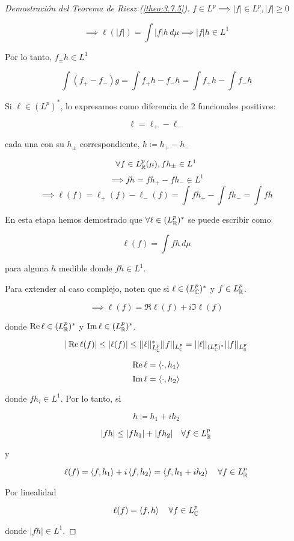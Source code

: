 \begin{proof}[Demostración del Teorema de Riesz (\ref{theo:3.7.5})]
        $f\in L^p\implies |f|\in L^p,|f|\geq 0$

        \[\implies \ell(|f|)=\int |f|h\,d\mu\implies |f|h\in L^1\]

        Por lo tanto, $f_{\pm}h\in L^1$

        \[\int (f_+-f_-)g=\int f_+h-f_-h=\int f_+h-\int f_-h\]

        Si $\ell\in (L^p)^*$, lo expresamos como diferencia de 2 funcionales positivos:

        \[\ell=\ell_+-\ell_-\]

        cada una con su $h_\pm$ correspondiente, $h\coloneqq h_+-h_-$

        \[\forall f\in L^p_{\mathbb{R}}(\mu), fh_\pm \in L^1\]
        \[\implies fh=fh_+-fh_-\in L^1\]
        \[\implies \ell(f)=\ell_+(f)-\ell_-(f)=\int fh_+-\int fh_-=\int fh\]

        En esta etapa hemos demostrado que $\forall \ell\in (L_{\mathbb{R}}^p)^*$ se puede escribir como 

        \[\ell(f)=\int fh\,d\mu\]

        para alguna $h$ medible donde $fh\in L^1$.

        Para extender al caso complejo, noten que si $\ell\in (L_{\mathbb{C}}^p)^*$ y $f\in L^p_{\mathbb{R}}$.

        \[\implies \ell(f)=\Re\ell(f)+i\Im\ell(f)\]

        donde $\operatorname{Re} \ell\in (L_{\mathbb{R}}^p)^*$ y $\operatorname{Im} \ell\in (L^p_{\mathbb{R}})^*$.

        \[|\operatorname{Re} \ell(f)|\leq |\ell(f)|\leq ||\ell||_{L_{\mathbb{C}}^p}^*||f||_{L_{\mathbb{C}}^p}=||\ell||_{(L_{\mathbb{C}}^p)^*}||f||_{L^p_{\mathbb{R}}}\]

        \[\operatorname{Re} \ell=\left\langle \cdot,h_1\right\rangle\]
        \[\operatorname{Im} \ell=\left\langle \cdot,h_2\right\rangle\]

        donde $fh_i\in L^1$. Por lo tanto, si 

        \[h\coloneqq h_1+ih_2\]

        \[|fh|\leq |fh_1|+|fh_2|\quad \forall f\in L_{\mathbb{R}}^p\]

        y 

        \[\ell(f)=\left\langle f,h_1\right\rangle+i\left\langle f,h_2\right\rangle=\left\langle f,h_1+ih_2\right\rangle\quad \forall f\in L^p_{\mathbb{R}}\]

        Por linealidad 

        \[\ell(f)=\left\langle f,h\right\rangle\quad\forall f\in L_{\mathbb{C}}^p\]

        donde $|fh|\in L^1$.
\end{proof}